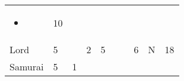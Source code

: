 \documentclass[12pt]{article}
\newcommand{\indexClass}[1]{\index{#1}}
\newcommand{\class}[1]{#1\indexClass{#1}}
\begin{document}
\begin{longtable}[]{@{}llllllllll@{}}
\begin{minipage}[t]{0.07\columnwidth}
\begin{itemize}
\item
\end{itemize}
\strut\end{minipage} &
\begin{minipage}[t]{0.08\columnwidth}\raggedright\strut
10
\strut\end{minipage}\tabularnewline
\begin{minipage}[t]{0.13\columnwidth}\raggedright\strut
\class{Lord}
\strut\end{minipage} &
\begin{minipage}[t]{0.06\columnwidth}\raggedright\strut
5
\strut\end{minipage} &
\begin{minipage}[t]{0.06\columnwidth}\raggedright\strut
\strut\end{minipage} &
\begin{minipage}[t]{0.06\columnwidth}\raggedright\strut
2
\strut\end{minipage} &
\begin{minipage}[t]{0.06\columnwidth}\raggedright\strut
5
\strut\end{minipage} &
\begin{minipage}[t]{0.06\columnwidth}\raggedright\strut
\strut\end{minipage} &
\begin{minipage}[t]{0.06\columnwidth}\raggedright\strut
\strut\end{minipage} &
\begin{minipage}[t]{0.06\columnwidth}\raggedright\strut
6
\strut\end{minipage} &
\begin{minipage}[t]{0.07\columnwidth}\raggedright\strut
N
\strut\end{minipage} &
\begin{minipage}[t]{0.08\columnwidth}\raggedright\strut
18
\strut\end{minipage}\tabularnewline
\begin{minipage}[t]{0.13\columnwidth}\raggedright\strut
\class{Samurai}
\strut\end{minipage} &
\begin{minipage}[t]{0.06\columnwidth}\raggedright\strut
5
\strut\end{minipage} &
\begin{minipage}[t]{0.06\columnwidth}\raggedright\strut
1
\strut\end{minipage} &
\begin{minipage}[t]{0.06\columnwidth}\raggedright\strut
\strut\end{minipage} &

\end{longtable}
\end{document}
